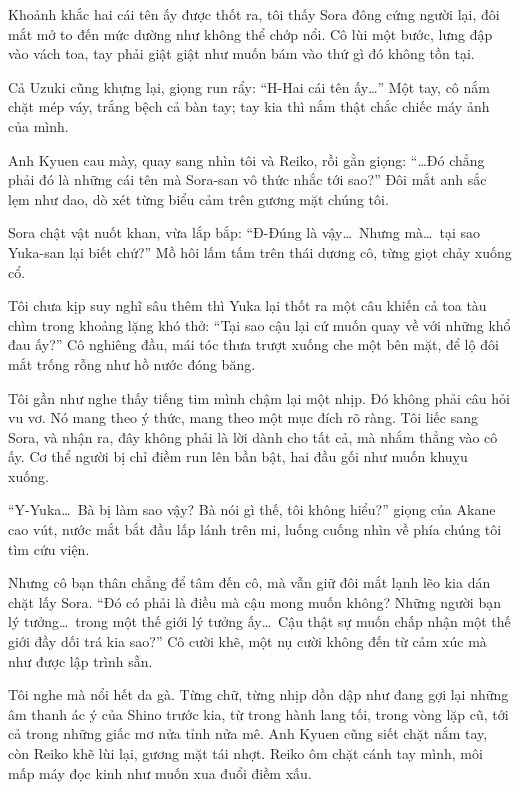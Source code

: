 \documentclass[../main.tex]{subfiles}
\begin{document}

Khoảnh khắc hai cái tên ấy được thốt ra, tôi thấy Sora đông cứng người lại, đôi mắt mở to đến mức dường như không thể chớp nổi. Cô lùi một bước, lưng đập vào vách toa, tay phải giật giật như muốn bám vào thứ gì đó không tồn tại.

Cả Uzuki cũng khựng lại, giọng run rẩy: ``H-Hai cái tên ấy\dots'' Một tay, cô nắm chặt mép váy, trắng bệch cả bàn tay; tay kia thì nắm thật chắc chiếc máy ảnh của mình.

Anh Kyuen cau mày, quay sang nhìn tôi và Reiko, rồi gằn giọng: ``\dots Đó chẳng phải đó là những cái tên mà Sora-san vô thức nhắc tới sao?'' Đôi mắt anh sắc lẹm như dao, dò xét từng biểu cảm trên gương mặt chúng tôi.

Sora chật vật nuốt khan, vừa lắp bắp: ``Đ-Đúng là vậy\dots\ Nhưng mà\dots\ tại sao Yuka-san lại biết chứ?'' Mồ hôi lấm tấm trên thái dương cô, từng giọt chảy xuống cổ.

Tôi chưa kịp suy nghĩ sâu thêm thì Yuka lại thốt ra một câu khiến cả toa tàu chìm trong khoảng lặng khó thở: ``Tại sao cậu lại cứ muốn quay về với những khổ đau ấy?'' Cô nghiêng đầu, mái tóc thưa trượt xuống che một bên mặt, để lộ đôi mắt trống rỗng như hồ nước đóng băng.

Tôi gần như nghe thấy tiếng tim mình chậm lại một nhịp. Đó không phải câu hỏi vu vơ. Nó mang theo ý thức, mang theo một mục đích rõ ràng. Tôi liếc sang Sora, và nhận ra, đây không phải là lời dành cho tất cả, mà nhắm thẳng vào cô ấy. Cơ thể người bị chỉ điềm run lên bần bật, hai đầu gối như muốn khuỵu xuống.

``Y-Yuka\dots\ Bà bị làm sao vậy? Bà nói gì thế, tôi không hiểu?'' giọng của Akane cao vút, nước mắt bắt đầu lấp lánh trên mi, luống cuống nhìn về phía chúng tôi tìm cứu viện.

Nhưng cô bạn thân chẳng để tâm đến cô, mà vẫn giữ đôi mắt lạnh lẽo kia dán chặt lấy Sora. ``Đó có phải là điều mà cậu mong muốn không? Những người bạn lý tưởng\dots\ trong một thế giới lý tưởng ấy\dots\ Cậu thật sự muốn chấp nhận một thế giới đầy dối trá kia sao?'' Cô cười khẽ, một nụ cười không đến từ cảm xúc mà như được lập trình sẵn.

Tôi nghe mà nổi hết da gà. Từng chữ, từng nhịp dồn dập như đang gợi lại những âm thanh ác ý của Shino trước kia, từ trong hành lang tối, trong vòng lặp cũ, tới cả trong những giấc mơ nửa tỉnh nửa mê. Anh Kyuen cũng siết chặt nắm tay, còn Reiko khẽ lùi lại, gương mặt tái nhợt. Reiko ôm chặt cánh tay mình, môi mấp máy đọc kinh như muốn xua đuổi điềm xấu.
\end{document}
